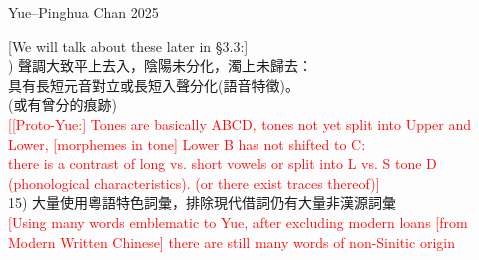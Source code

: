 \documentclass{beamer}
\begin{document}
\begin{frame}[fragile]{Yue–Pinghua \scriptsize{Chan 2025}}

{\small
[We will talk about these later in §3.3:]\\
) 聲調大致平上去入，陰陽未分化，濁上未歸去：\\
具有長短元音對立或長短入聲分化(語音特徵)。\\
(或有曾分的痕跡)\\
\textcolor{red}{[[Proto-Yue:] Tones are basically ABCD, tones not yet split into Upper and Lower, [morphemes in tone] Lower B has not shifted to C:\\ there is a contrast of long vs. short vowels or split into L vs. S tone D (phonological characteristics). (or there exist traces thereof)]}\\
\medskip{}
15) 大量使用粵語特色詞彙，排除現代借詞仍有大量非漢源詞彙\\
\textcolor{red}{[Using many words emblematic to Yue, after excluding modern loans [from Modern Written Chinese] there are still many words of non-Sinitic origin}
}
\end{frame}
\end{document}
